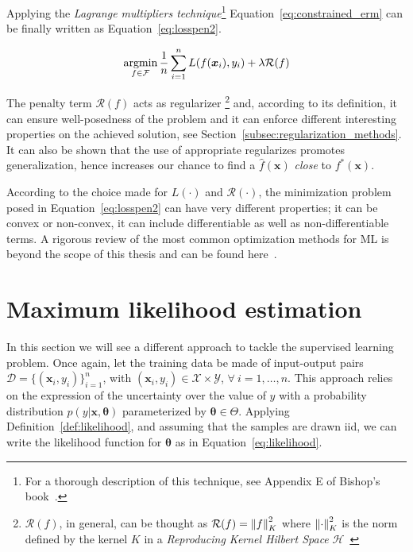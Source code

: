 Applying the \textit{Lagrange multipliers technique}\footnote{ For a thorough description of this technique, see Appendix E of Bishop's book~\cite{bishop2006pattern}.} Equation~\eqref{eq:constrained_erm} can be finally written as Equation~\eqref{eq:losspen2}.

\begin{equation} \label{eq:losspen2}
	\mathop{\mathrm{argmin}}\limits_{f \in \mathcal{F}}{\frac{1}{n} \sum_{i=1}^{n} L(f(\bm{x}_i), y_i)} + \lambda \mathcal{R}(f)
\end{equation}

The penalty term $\mathcal{R}(f)$ acts as regularizer \footnote{ $\mathcal{R}(f)$, in general, can be thought as $\mathcal{R}(f) = \left\lVert f\right\rVert^2_K$ where $\left\lVert\cdot\right\rVert^2_K$ is the norm defined by the kernel $K$ in a \textit{Reproducing Kernel Hilbert Space} $\mathcal{H}$~\cite{evgeniou2000regularization}}
and, according to its definition, it can ensure well-posedness of the problem and it can enforce different interesting properties on the achieved solution, see Section~\ref{subsec:regularization_methods}. It can also be shown that the use of appropriate regularizes promotes generalization, hence increases our chance to find a $\hat f(\bm{x})$ \textit{close} to $f^*(\bm{x})$.

 According to the choice made for $L(\cdot)$ and $\mathcal{R}(\cdot)$, the minimization problem posed in Equation~\eqref{eq:losspen2} can have very different properties; it can be convex or non-convex, it can include differentiable as well as non-differentiable terms. A rigorous review of the most common optimization methods for ML is beyond the scope of this thesis and can be found here~\cite{boyd2004convex, bach2012optimization, sra2012optimization, nesterov2013introductory}.


\section{Maximum likelihood  estimation} \label{sec:mle}
In this section we will see a different approach to tackle the supervised learning problem.
Once again, let the training data be made of input-output pairs $\mathcal{D} = \{(\bm{x}_i, y_i)\}_{i=1}^n$, with $(\bm{x}_i,y_i) \in \mathcal{X} \times \mathcal{Y}$, $\forall~i=1,\dots,n$. This approach relies on the expression of the uncertainty over the value of $y$ with a probability distribution $p(y|\bm{x},\bm{\theta})$ parameterized by $\bm{\theta} \in \Theta$.
Applying Definition~\ref{def:likelihood}, and assuming that the samples are drawn \ac{iid}, we can write the likelihood function for $\bm{\theta}$ as in Equation~\eqref{eq:likelihood}.

